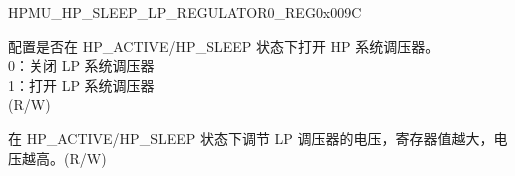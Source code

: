 \begin{register}{H}{PMU\_HP\_SLEEP\_LP\_REGULATOR0\_REG}{0x009C}\label{regdesc:PMUHPSLEEPLPREGULATOR0REG}
%
%
%
%
\regnewline%
\begin{regdesc}\begin{reglist}
\label{fielddesc:PMUHPSLEEPLPREGULATORXPD}\item [PMU\_HP\_SLEEP\_LP\_REGULATOR\_XPD] 配置是否在 HP\_ACTIVE/HP\_SLEEP 状态下打开 HP 系统调压器。\\
0：关闭 LP 系统调压器 \\
1：打开 LP 系统调压器\\
(R/W)
\label{fielddesc:PMUHPSLEEPLPREGULATORDBIAS}\item [PMU\_HP\_SLEEP\_LP\_REGULATOR\_DBIAS] 在 HP\_ACTIVE/HP\_SLEEP 状态下调节 LP 调压器的电压，寄存器值越大，电压越高。(R/W)
\end{reglist}\end{regdesc}
\end{register}


